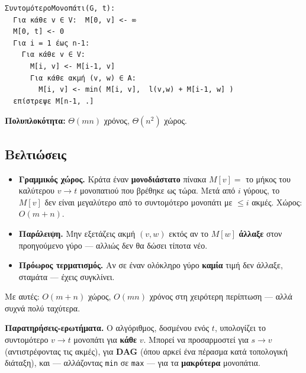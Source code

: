 \documentclass[11pt,a4paper]{article}
\begin{document}
\begin{codebox}
\begin{verbatim}
ΣυντομότεροΜονοπάτι(G, t):
  Για κάθε v ∈ V:  M[0, v] <- ∞
  M[0, t] <- 0
  Για i = 1 έως n-1:
    Για κάθε v ∈ V:
      M[i, v] <- M[i-1, v]
      Για κάθε ακμή (v, w) ∈ A:
        M[i, v] <- min( M[i, v],  l(v,w) + M[i-1, w] )
  επίστρεψε M[n-1, .]
\end{verbatim}
\end{codebox}

\textbf{Πολυπλοκότητα:} $\Theta(mn)$ χρόνος, $\Theta(n^2)$ χώρος.

\subsection{Βελτιώσεις}

\begin{keypoint}
\begin{itemize}
  \item \textbf{Γραμμικός χώρος.} Κράτα έναν \textbf{μονοδιάστατο} πίνακα
  $M[v] = $ το μήκος του καλύτερου $v \to t$ μονοπατιού που βρέθηκε ως τώρα.
  Μετά από $i$ γύρους, το $M[v]$ δεν είναι μεγαλύτερο από το συντομότερο
  μονοπάτι με $\le i$ ακμές. Χώρος: $O(m + n)$.
  \item \textbf{Παράλειψη.} Μην εξετάζεις ακμή $(v, w)$ εκτός αν το $M[w]$
  \textbf{άλλαξε} στον προηγούμενο γύρο --- αλλιώς δεν θα δώσει τίποτα νέο.
  \item \textbf{Πρόωρος τερματισμός.} Αν σε έναν ολόκληρο γύρο \textbf{καμία}
  τιμή δεν άλλαξε, σταμάτα --- έχεις συγκλίνει.
\end{itemize}
\end{keypoint}

Με αυτές: $O(m + n)$ χώρος, $O(mn)$ χρόνος στη χειρότερη περίπτωση --- αλλά
συχνά πολύ ταχύτερα.

\begin{notebox}
\textbf{Παρατηρήσεις-ερωτήματα.} Ο αλγόριθμος, δοσμένου ενός $t$, υπολογίζει το
συντομότερο $v \to t$ μονοπάτι για \textbf{κάθε} $v$. Μπορεί να προσαρμοστεί για
$s \to v$ (αντιστρέφοντας τις ακμές), για \textbf{DAG} (όπου αρκεί ένα πέρασμα
κατά τοπολογική διάταξη), και --- αλλάζοντας \texttt{min} σε \texttt{max} ---
για τα \textbf{μακρύτερα} μονοπάτια.
\end{notebox}
\end{document}
